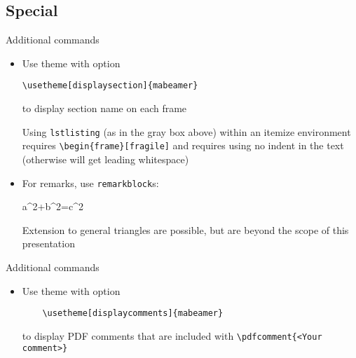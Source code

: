 \documentclass{beamer}
\begin{document}
\subsection{Special}

\begin{frame}[fragile]{Additional commands}
\begin{itemize}
	\item Use theme with option
	\begin{lstlisting}
\usetheme[displaysection]{mabeamer}
	\end{lstlisting}
	to display section name on each frame
	\begin{alertblock}[\bigexclaim]
		Using \texttt{lstlisting} (as in the gray box above) within an itemize environment requires 
		 \texttt{\textbackslash begin\{frame\}[fragile]} and requires using no indent in the text (otherwise will get leading whitespace)
	\end{alertblock}
	
	\item For remarks, 	use \texttt{remarkblock}s:
	\begin{equationblock}[Pythagoras]
		a^2+b^2=c^2
	\end{equationblock}
	\begin{remarkblock}
		\centering Extension to general triangles are possible, but are beyond the scope of this presentation
	\end{remarkblock}
\end{itemize}
\end{frame}
\begin{frame}[fragile]{Additional commands}
\begin{itemize}
	\item Use theme with option
	\begin{lstlisting}
	\usetheme[displaycomments]{mabeamer}
	\end{lstlisting}
	to display PDF comments that are included with \verb||
	\pdfcomment{<Your comment>}
\end{itemize}
\end{frame}
\end{document}
